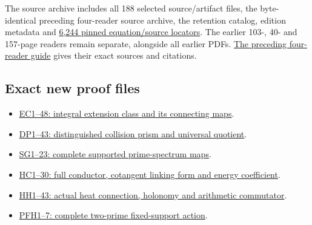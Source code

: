\documentclass[
]{article}
\providecommand{\tightlist}{%
  \setlength{\itemsep}{0pt}\setlength{\parskip}{0pt}}
\begin{document}
The source archive includes all 188 selected source/artifact files, the
byte-identical preceding four-reader source archive, the retention
catalog, edition metadata and \href{PINNED_PROOF_LINKS.json}{6,244
pinned equation/source locators}. The earlier 103-, 40- and 157-page
readers remain separate, alongside all earlier PDFs.
\href{https://github.com/KokunoYumeto/zeta-function-research-reader/blob/6c702bb8aa71c1129198b61f3d61d43265853320/workbenches/splitzero-tandem/continuations/20260923-cohomology-heat-residue-publication/README.md}{The
preceding four-reader guide} gives their exact sources and citations.

\subsection{Exact new proof files}\label{exact-new-proof-files}

\begin{itemize}
\tightlist
\item
  \href{https://github.com/KokunoYumeto/zeta-function-research-reader/blob/3c022a0adde0a6aa3d8fc8e43ef42795d88e44b0/workbenches/splitzero-tandem/branches/tau-zero-prime-positivity/NILRADICAL_COTANGENT_EXTENSION_CLASS_DERIVATION.tex}{EC1--48:
  integral extension class and its connecting maps}.
\item
  \href{https://github.com/KokunoYumeto/zeta-function-research-reader/blob/3c022a0adde0a6aa3d8fc8e43ef42795d88e44b0/workbenches/splitzero-tandem/branches/tau-zero-prime-positivity/DISTINGUISHED_COLLISION_PRISM_DERIVATION.tex}{DP1--43:
  distinguished collision prism and universal quotient}.
\item
  \href{https://github.com/KokunoYumeto/zeta-function-research-reader/blob/3c022a0adde0a6aa3d8fc8e43ef42795d88e44b0/workbenches/splitzero-tandem/branches/tau-zero-prime-positivity/SUPPORTED_PRISM_SPECTRUM_DERIVATION.tex}{SG1--23:
  complete supported prime-spectrum maps}.
\item
  \href{https://github.com/KokunoYumeto/zeta-function-research-reader/blob/3c022a0adde0a6aa3d8fc8e43ef42795d88e44b0/workbenches/splitzero-tandem/continuations/20260923-supported-zero-collision-holonomy/HEAT_COLLISION_CONDUCTOR.tex}{HC1--30:
  full conductor, cotangent linking form and energy coefficient}.
\item
  \href{https://github.com/KokunoYumeto/zeta-function-research-reader/blob/3c022a0adde0a6aa3d8fc8e43ef42795d88e44b0/workbenches/splitzero-tandem/continuations/20260923-supported-zero-collision-holonomy/HEAT_COLLISION_HOLONOMY.tex}{HH1--43:
  actual heat connection, holonomy and arithmetic commutator}.
\item
  \href{https://github.com/KokunoYumeto/zeta-function-research-reader/blob/3c022a0adde0a6aa3d8fc8e43ef42795d88e44b0/workbenches/splitzero-tandem/continuations/20260923-supported-zero-collision-holonomy/PRIME_FIXED_SUPPORT_RECEIVER.tex}{PFH1--7:
  complete two-prime fixed-support action}.
\end{itemize}
\end{document}
